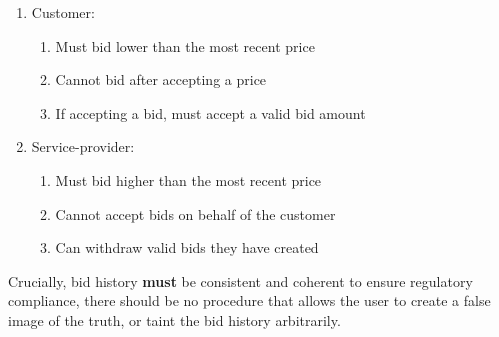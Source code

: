 \documentclass[journal]{classes/IEEEtran}
\begin{document}
	\begin{enumerate}
		\item Customer:
		\begin{enumerate}
			\item Must bid lower than the most recent price
			\item Cannot bid after accepting a price
			\item If accepting a bid, must accept a valid bid amount
		\end{enumerate}
		\item Service-provider:
		\begin{enumerate}
			\item Must bid higher than the most recent price
			\item Cannot accept bids on behalf of the customer
			\item Can withdraw valid bids they have created
		\end{enumerate}
	\end{enumerate}
	
	Crucially, bid history \textbf{must} be consistent and coherent to ensure regulatory compliance, there should be no procedure that allows the user to create a false image of the truth, or taint the bid history arbitrarily.
	
\end{document}
